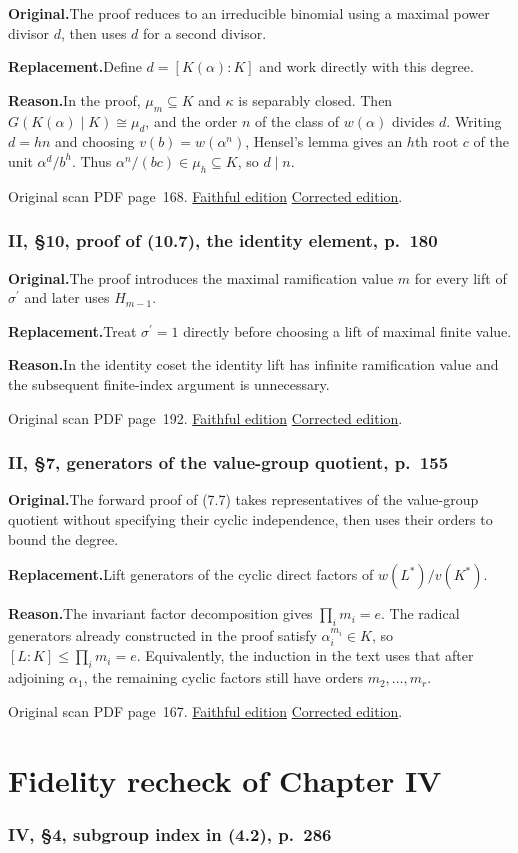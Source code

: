 \documentclass[11pt,a4paper]{article}
\newcommand{\original}{\par\smallskip\noindent\textbf{Original.}\enspace}
\newcommand{\replacement}{\par\smallskip\noindent\textbf{Replacement.}\enspace}
\newcommand{\reason}{\par\smallskip\noindent\textbf{Reason.}\enspace}
\newcommand{\editionlink}[3]{\href{#1\#errata.#2}{#3}}
\newcommand{\location}[2]{%
  \par\smallskip\noindent Original scan PDF page~#2.\enspace
  \editionlink{Neukirch_Faithful.pdf}{#1}{Faithful edition}
  \quad\editionlink{Neukirch_Corrected.pdf}{#1}{Corrected edition}.}
\begin{document}
\original The proof reduces to an irreducible binomial using a maximal power divisor $d$, then uses $d$ for a second divisor.
\replacement Define $d=[K(\alpha):K]$ and work directly with this degree.
\reason In the proof, $\mu_m\subseteq K$ and $\kappa$ is separably closed. Then $G(K(\alpha)\mid K)\cong\mu_d$, and the order $n$ of the class of $w(\alpha)$ divides $d$. Writing $d=hn$ and choosing $v(b)=w(\alpha^n)$, Hensel\textquoteright{}s lemma gives an $h$th root $c$ of the unit $\alpha^d/b^h$. Thus $\alpha^n/(bc)\in\mu_h\subseteq K$, so $d\mid n$.
\location{193}{168}

\setcounter{section}{193}
\section{II, \S10, proof of (10.7), the identity element, p.~180}\label{errata:item:194}

\original The proof introduces the maximal ramification value $m$ for every lift of $\sigma^{\prime}$ and later uses $H_{m-1}$.
\replacement Treat $\sigma^{\prime}=1$ directly before choosing a lift of maximal finite value.
\reason In the identity coset the identity lift has infinite ramification value and the subsequent finite-index argument is unnecessary.
\location{194}{192}

\setcounter{section}{216}
\section{II, \S7, generators of the value-group quotient, p.~155}\label{errata:item:217}

\original The forward proof of (7.7) takes representatives of the value-group quotient without specifying their cyclic independence, then uses their orders to bound the degree.
\replacement Lift generators of the cyclic direct factors of $w(L^*)/v(K^*)$.
\reason The invariant factor decomposition gives $\prod_i m_i=e$. The radical generators already constructed in the proof satisfy $\alpha_i^{m_i}\in K$, so $[L:K]\le\prod_i m_i=e$. Equivalently, the induction in the text uses that after adjoining $\alpha_1$, the remaining cyclic factors still have orders $m_2,\ldots,m_r$.
\location{217}{167}

\part{Fidelity recheck of Chapter IV}
\setcounter{section}{194}
\section{IV, \S4, subgroup index in (4.2), p.~286}\label{errata:item:195}
\end{document}
